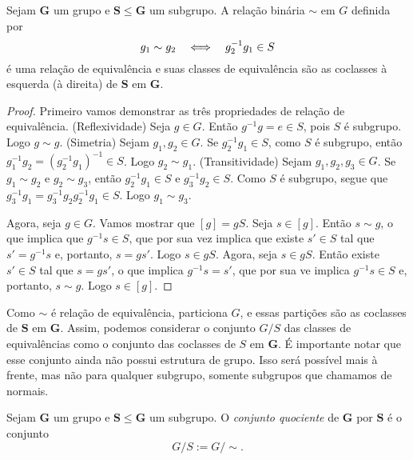 \begin{prop}
Sejam $\bm G$ um grupo e $\bm S \leq \bm G$ um subgrupo. A relação binária $\sim$ em $G$ definida por
	\begin{equation*}
	g_1 \sim g_2 \quad \Longleftrightarrow \quad g_2^{-1}g_1 \in S
	\end{equation*}
é uma relação de equivalência e suas classes de equivalência são as coclasses à esquerda (à direita) de $\bm S$ em $\bm G$.
\end{prop}
\begin{proof}
Primeiro vamos demonstrar as três propriedades de relação de equivalência. (Reflexividade) Seja $g \in G$. Então $g^{-1}g=e \in S$, pois $S$ é subgrupo. Logo $g \sim g$. (Simetria) Sejam $g_1,g_2 \in G$. Se $g_2^{-1}g_1 \in S$, como $S$ é subgrupo, então $g_1^{-1}g_2=(g_2^{-1}g_1)^{-1} \in S$. Logo $g_2 \sim g_1$. (Transitividade) Sejam $g_1,g_2,g_3 \in G$. Se $g_1 \sim g_2$ e $g_2 \sim g_3$, então $g_2^{-1}g_1 \in S$ e $g_3^{-1}g_2 \in S$. Como $S$ é subgrupo, segue que $g_3^{-1}g_1=g_3^{-1}g_2g_2^{-1}g_1 \in S$. Logo $g_1 \sim g_3$.

Agora, seja $g \in G$. Vamos mostrar que $[g]=gS$. Seja $s \in [g]$. Então $s \sim g$, o que implica que $g^{-1}s \in S$, que por sua vez implica que existe $s' \in S$ tal que $s'=g^{-1}s$ e, portanto, $s=gs'$. Logo $s \in gS$. Agora, seja $s \in gS$. Então existe $s' \in S$ tal que $s=gs'$, o que implica $g^{-1}s=s'$, que por sua ve implica $g^{-1}s \in S$ e, portanto, $s \sim g$. Logo $s \in [g]$.
\end{proof}

Como $\sim$ é relação de equivalência, particiona $G$, e essas partições são as coclasses de $\bm S$ em $\bm G$. Assim, podemos considerar o conjunto $G/S$ das classes de equivalências como o conjunto das coclasses de $S$ em $\bm G$. É importante notar que esse conjunto ainda não possui estrutura de grupo. Isso será possível mais à frente, mas não para qualquer subgrupo, somente subgrupos que chamamos de normais.

\begin{defi}
Sejam $\bm G$ um grupo e $\bm S \leq \bm G$ um subgrupo. O \emph{conjunto quociente} de $\bm G$ por $\bm S$ é o conjunto
	\begin{equation*}
	G/S := G/\sim.
	\end{equation*}
\end{defi}

